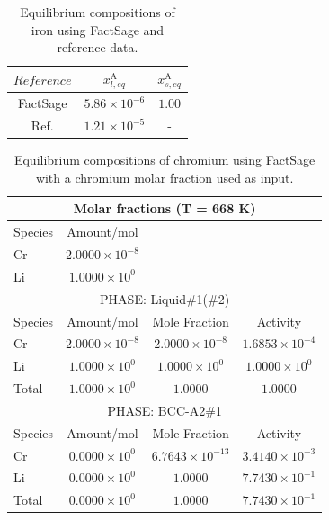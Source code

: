 \begin{table}[ht]
	\centering
	\label{tab:your_label_here}
	\begin{tabular}{ccc}
	\hline
	$Reference$ & $x^{\text{A}}_{l,eq}$ & $x^{\text{A}}_{s,eq}$ \\ \hline
	FactSage \cite{Bale2016} & $5.86 \times 10^{-6} $        & $1.00$         \\
	Ref. \cite{Leavenworth1961TheSO}       & $1.21 \times 10^{-5}$         & -         \\
	\end{tabular}
	\caption{Equilibrium compositions of iron using FactSage and reference data.}
\end{table}

\begin{table}[ht]
	\centering
	\label{tab:molar_fractions_cr_li}
	\begin{tabular}{lccc}
	\hline
	\multicolumn{4}{c}{Molar fractions (T = 668 K)} \\
	\hline
	Species & Amount/mol & & \\
	\hline
	Cr & $2.0000 \times 10^{-8}$ & & \\
	Li & $1.0000 \times 10^{0}$ & & \\
	\hline
	\multicolumn{4}{c}{PHASE: Liquid\#1(\#2)} \\
	\hline
	Species & Amount/mol & Mole Fraction & Activity \\
	\hline
	Cr & $2.0000 \times 10^{-8}$ & $2.0000 \times 10^{-8}$ & $1.6853 \times 10^{-4}$ \\
	Li & $1.0000 \times 10^{0}$ & $1.0000 \times 10^{0}$ & $1.0000 \times 10^{0}$ \\
	Total & $1.0000 \times 10^{0}$ & $1.0000$ & $1.0000$ \\
	\hline
	\multicolumn{4}{c}{PHASE: BCC-A2\#1} \\
	\hline
	Species & Amount/mol & Mole Fraction & Activity \\
	\hline
	Cr & $0.0000 \times 10^{0}$ & $6.7643 \times 10^{-13}$ & $3.4140 \times 10^{-3}$ \\
	Li & $0.0000 \times 10^{0}$ & $1.0000$ & $7.7430 \times 10^{-1}$ \\
	Total & $0.0000 \times 10^{0}$ & $1.0000$ & $7.7430 \times 10^{-1}$ \\
	\hline
	\end{tabular}
	\caption{Equilibrium compositions of chromium using FactSage with a chromium molar fraction used as input.}
\end{table}

